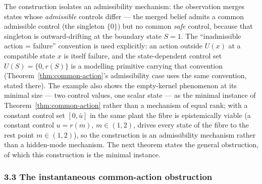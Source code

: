 \documentclass[10pt,twocolumn]{article}
\theoremstyle{definition}
\begin{document}
The construction isolates an admissibility mechanism: the observation merges states whose \emph{admissible}
controls differ --- the merged belief admits a common admissible control
(the singleton \(\{0\}\)) but no common \emph{safe} control, because
that singleton is outward-drifting at the boundary state \(S = 1\). The
``inadmissible action = failure'' convention is used explicitly: an action outside \(U(x)\) at a compatible state \(x\) is
itself failure, and the state-dependent control set
\(U(S) = \{0, r(S)\}\) is a modelling primitive carrying that convention
(Theorem~\ref{thm:common-action}'s admissibility case uses the same convention, stated there).
The example also shows the empty-kernel phenomenon at its minimal size
--- two control values, one scalar state --- as the minimal instance of
Theorem~\ref{thm:common-action} rather than a mechanism of equal rank; with a constant control
set \([0, \bar u]\) in the same plant the fibre is epistemically viable
(a constant control \(u = r(m)\), \(m \in (1,2)\), drives every state of
the fibre to the rest point \(m \in (1,2)\)), so the construction is an admissibility mechanism rather than a hidden-mode mechanism. The next
theorem states the general obstruction, of which this construction is
the minimal instance.

\subsubsection{3.3 The instantaneous common-action
obstruction}\label{the-instantaneous-common-action-obstruction}
\end{document}
